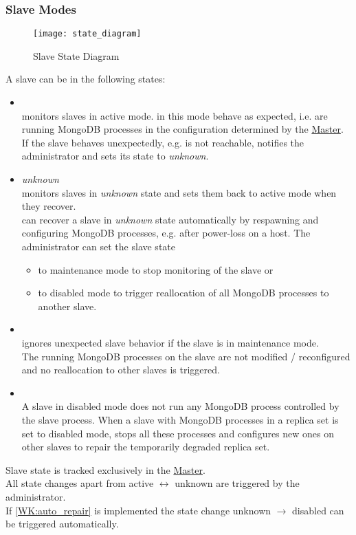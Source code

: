 \documentclass[a4paper, 11pt]{article}
\begin{document}
\subsubsection{Slave Modes}\label{SM:SlaveModes}
\begin{figure}[H]
\centering
\texttt{[image: state\_diagram]}
\caption{Slave State Diagram}
\end{figure}
A slave can be in the following states:
\begin{itemize}
	\item {}\\
	\mamid monitors \glspl{slave} in active mode.  in this mode behave as expected, i.e. are running MongoDB processes in the configuration determined by the \hyperref[SM:Master]{Master}.\\
	If the slave behaves unexpectedly, e.g. is not reachable, \mamid notifies the \gls{administrator} and sets its state to \emph{unknown}.
	\item \emph{unknown}\\
	\mamid monitors \glspl{slave} in \emph{unknown} state and sets them back to \gls{active mode} when they recover.\\
	\mamid can recover a slave in \emph{unknown} state automatically by respawning and configuring MongoDB processes, e.g. after power-loss on a  \gls{host}.
	The \gls{administrator} can set the slave state
	\begin{itemize}
		\item to \gls{maintenance mode} to stop monitoring of the slave or
		\item to \gls{disabled mode} to trigger reallocation of all \gls{MongoDB} processes to another slave.
	\end{itemize}
	\item {}\\
	\mamid ignores unexpected slave behavior if the slave is in maintenance mode.\\The running MongoDB processes on the slave are not modified / reconfigured and no reallocation to other slaves is triggered.
	\item {}\\
	A \gls{slave} in disabled mode does not run any \gls{MongoDB} process controlled by the slave process. When a \gls{slave} with MongoDB processes in a \gls{replica set} is set to disabled mode, \mamid stops all these processes and configures new ones on other \glspl{slave} to repair the temporarily degraded replica set.
\end{itemize}
Slave state is tracked exclusively in the \hyperref[SM:Master]{Master}.\\
All state changes apart from active $\leftrightarrow$ unknown are triggered by the \gls{administrator}.\\
If \ref{WK:auto_repair} is implemented the state change unknown $\rightarrow$ disabled can be triggered automatically.
\end{document}
